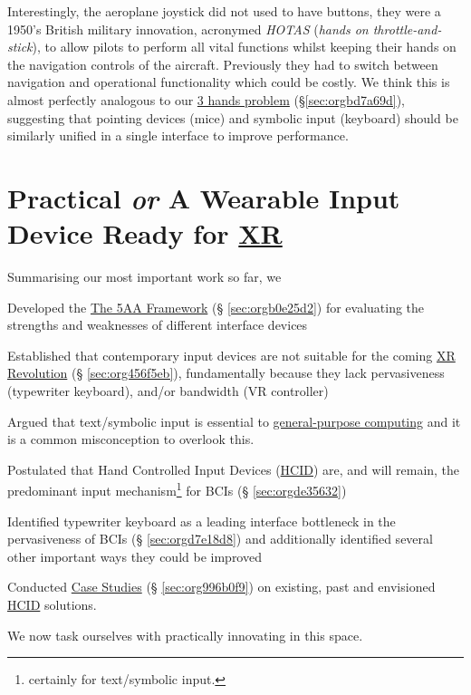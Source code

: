 \documentclass[logo,bsc,singlespacing,parskip]{infthesis}
\begin{document}
Interestingly, the aeroplane joystick did not used to have buttons, they were a 1950's British military innovation, acronymed \emph{HOTAS} (\emph{hands on throttle-and-stick}), to allow pilots to perform all vital functions whilst keeping their hands on the navigation controls of the aircraft.
Previously they had to switch between navigation and operational functionality which could be costly.
We think this is almost perfectly analogous to our \hyperref[sec:orgbd7a69d]{3 hands problem} (\S \ref{sec:orgbd7a69d}), suggesting that pointing devices (mice) and symbolic input (keyboard) should be similarly unified in a single interface to improve performance.

\part{Practical \emph{or} A Wearable Input Device Ready for \hyperref[orgf7f8e78]{XR}}
\label{sec:orgee89f2f}
Summarising our most important work so far, we
\begin{enumerate*}[label={\arabic*)}, itemjoin={, \,}, itemjoin*={, and \,}]
\item Developed the \hyperref[sec:orgb0e25d2]{The 5AA Framework} (§ \ref{sec:orgb0e25d2}) for evaluating the strengths and weaknesses of different interface devices
\item Established that contemporary input devices are not suitable for the coming \hyperref[sec:org456f5eb]{XR Revolution} (§ \ref{sec:org456f5eb}), fundamentally because they lack pervasiveness (typewriter keyboard), and/or bandwidth (VR controller)
\item Argued that text/symbolic input is essential to \hyperref[org628f737]{general-purpose computing} and it is a common misconception to overlook this.
\item Postulated that Hand Controlled Input Devices (\hyperref[org30e2275]{HCID}) are, and will remain, the predominant input mechanism\footnote{certainly for text/symbolic input.} for BCIs (§ \ref{sec:orgde35632})
\item Identified typewriter keyboard as a leading interface bottleneck in the pervasiveness of BCIs (§ \ref{sec:orgd7e18d8}) and additionally identified several other important ways they could be improved
\item Conducted \hyperref[sec:org996b0f9]{Case Studies} (§ \ref{sec:org996b0f9}) on existing, past and envisioned \hyperref[org30e2275]{HCID} solutions.
\end{enumerate*}
We now task ourselves with practically innovating in this space. \medskip
\end{document}
